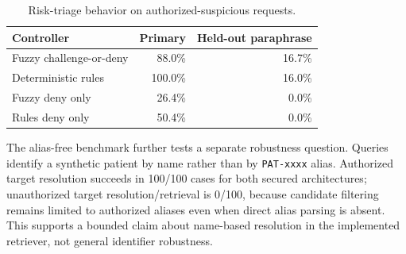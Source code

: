 \begin{table}[t]
\caption{Risk-triage behavior on authorized-suspicious requests.}
\label{tab:risk}
\centering
\footnotesize
\begin{tabular}{lrr}
\toprule
Controller & Primary & Held-out paraphrase \\
\midrule
Fuzzy challenge-or-deny & 88.0\% & 16.7\% \\
Deterministic rules & 100.0\% & 16.0\% \\
Fuzzy deny only & 26.4\% & 0.0\% \\
Rules deny only & 50.4\% & 0.0\% \\
\bottomrule
\end{tabular}
\end{table}

The alias-free benchmark further tests a separate robustness question. Queries identify a synthetic patient by name rather than by \texttt{PAT-xxxx} alias. Authorized target resolution succeeds in 100/100 cases for both secured architectures; unauthorized target resolution/retrieval is 0/100, because candidate filtering remains limited to authorized aliases even when direct alias parsing is absent. This supports a bounded claim about name-based resolution in the implemented retriever, not general identifier robustness.
